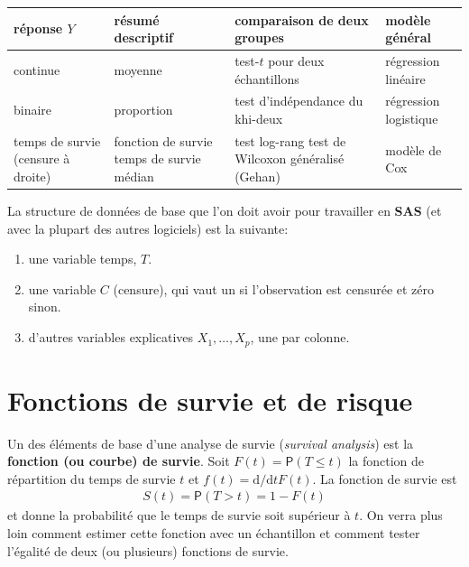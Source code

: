 \documentclass[
  11pt,
  letterpaper,
]{book}
\providecommand{\tightlist}{%
  \setlength{\itemsep}{0pt}\setlength{\parskip}{0pt}}
\theoremstyle{definition}
\theoremstyle{definition}
\theoremstyle{definition}
\theoremstyle{remark}
\begin{document}
\begin{longtable}[]{@{}
  >{\raggedright\arraybackslash}p{}
  >{\raggedright\arraybackslash}p{}
  >{\raggedright\arraybackslash}p{}
  >{\raggedright\arraybackslash}p{}@{}}
\toprule
réponse \(Y\) & résumé descriptif & comparaison de deux groupes & modèle général \\
\midrule
\endhead
continue & moyenne & test-\(t\) pour deux échantillons & régression linéaire \\
binaire & proportion & test d'indépendance du khi-deux & régression logistique \\
temps de survie (censure à droite) & fonction de survie temps de survie médian & test log-rang test de Wilcoxon généralisé (Gehan) & modèle de Cox \\
\bottomrule
\end{longtable}

La structure de données de base que l'on doit avoir pour travailler en \textbf{SAS} (et avec la plupart des autres logiciels) est la suivante:

\begin{enumerate}
\def\labelenumi{\arabic{enumi})}
\tightlist
\item
  une variable temps, \(T\).
\item
  une variable \(C\) (censure), qui vaut un si l'observation est censurée et zéro sinon.
\item
  d'autres variables explicatives \(X_1, \ldots, X_p\), une par colonne.
\end{enumerate}

\hypertarget{fonctions-de-survie-et-de-risque}{%
\section{Fonctions de survie et de risque}\label{fonctions-de-survie-et-de-risque}}

Un des éléments de base d'une analyse de survie (\emph{survival analysis}) est la \textbf{fonction (ou courbe) de survie}. Soit \(F(t)={\mathsf P}\left(T \leq t\right)\) la fonction de répartition du temps de survie \(t\) et \(f(t) = \mathrm{d}/ \mathrm{d}t F(t)\). La fonction de survie est
\begin{align*}
S(t)= {\mathsf P}\left(T > t\right) = 1-F(t)
\end{align*}
et donne la probabilité que le temps de survie soit supérieur à \(t\). On verra plus loin comment estimer cette fonction avec un échantillon et comment tester l'égalité de deux (ou plusieurs) fonctions de survie.
\end{document}
